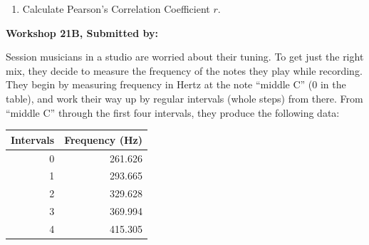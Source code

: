 \documentclass[11pt, chapterprefix=true]{scrbook}\usepackage[]{graphicx}\usepackage[]{color}
\begin{document}
\begin{exercises}
\begin{exercise}
\begin{enumerate}
  \item	Calculate Pearson’s Correlation Coefficient $r$.
\end{enumerate}

\end{exercise}
\begin{solution}  %

\end{solution}


\clearpage

    \begin{exercise}  %

    \begin{center}
\begin{flushleft}\textbf{\large \hfill Workshop 21B, Submitted by: }\end{flushleft}

\end{center}

Session musicians in a studio are worried about their tuning. To get just the right mix, they decide to measure the frequency of the notes they play while recording. They begin by measuring frequency in Hertz at the note ``middle C'' (0 in the table), and work their way up by regular intervals (whole steps) from there.  From ``middle C'' through the first four intervals, they produce the following data:

\begin{center}
\begin{tabular}{@{} rr @{}} \hline
Intervals	& Frequency (Hz) \\ \hline
0 &	261.626 \\
1 &	293.665 \\
2 &	329.628 \\
3	& 369.994 \\
4	& 415.305 \\ \hline
\end{tabular}
\end{center}


\end{exercise}
\end{exercises}
\end{document}
